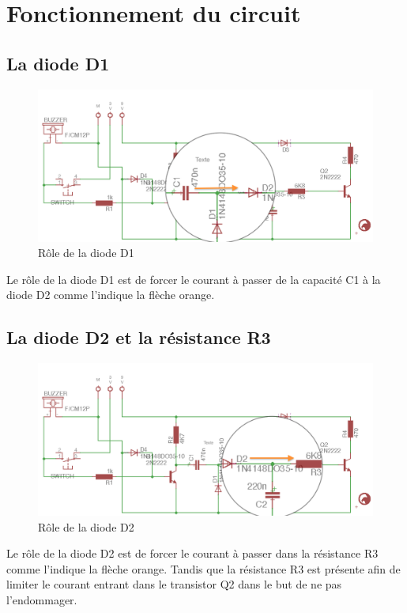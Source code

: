 \chapter{Fonctionnement du circuit}

\section{La diode D1}

\begin{figure}[H]
\centering
\includegraphics[width=1\textwidth]{ressources/roleDiodeD1}
\caption{Rôle de la diode D1}
\end{figure}

Le rôle de la diode D1 est de forcer le courant à passer de la capacité C1 à la diode D2 comme l'indique la flèche orange.

\section{La diode D2 et la résistance R3}

\begin{figure}[H]
\centering
\includegraphics[width=1\textwidth]{ressources/roleDiodeD2}
\caption{Rôle de la diode D2}
\end{figure}

Le rôle de la diode D2 est de forcer le courant à passer dans la résistance R3 comme l'indique la flèche orange. Tandis que la résistance R3 est présente afin de limiter le courant entrant dans le transistor Q2 dans le but de ne pas l'endommager.

